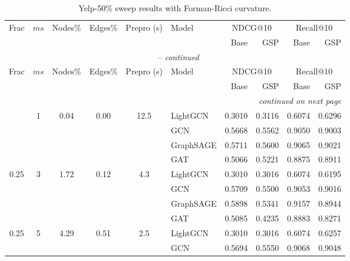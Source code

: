 {\footnotesize
\setlength{\tabcolsep}{4pt}
\begin{longtable}{cccccl rrrr}
\caption{Yelp-50\% sweep results with Forman-Ricci curvature.}
\label{tab:yelp_forman_ricci_sweep} \\
\toprule
\multirow{2}{*}{Frac} & \multirow{2}{*}{$ms$} & \multirow{2}{*}{Nodes\%} & \multirow{2}{*}{Edges\%} & \multirow{2}{*}{Prepro (s)} & \multirow{2}{*}{Model} &
  \multicolumn{2}{c}{NDCG@10} & \multicolumn{2}{c}{Recall@10} \\
\cmidrule(lr){7-8}\cmidrule(lr){9-10}
 & & & & & & Base & GSP & Base & GSP \\
\midrule
\endfirsthead
\multicolumn{10}{c}{\tablename~\thetable{} -- \textit{continued}} \\
\toprule
\multirow{2}{*}{Frac} & \multirow{2}{*}{$ms$} & \multirow{2}{*}{Nodes\%} & \multirow{2}{*}{Edges\%} & \multirow{2}{*}{Prepro (s)} & \multirow{2}{*}{Model} &
  \multicolumn{2}{c}{NDCG@10} & \multicolumn{2}{c}{Recall@10} \\
\cmidrule(lr){7-8}\cmidrule(lr){9-10}
 & & & & & & Base & GSP & Base & GSP \\
\midrule
\endhead
\midrule \multicolumn{10}{r}{\textit{continued on next page}} \\
\endfoot
\bottomrule
\endlastfoot
\multirow{4}{*}{0.25} & \multirow{4}{*}{1} & \multirow{4}{*}{0.04} & \multirow{4}{*}{0.00} & \multirow{4}{*}{12.5} & LightGCN & 0.3010 & 0.3116 & 0.6074 & 0.6296 \\
 & & & & & GCN & 0.5668 & 0.5562 & 0.9050 & 0.9003 \\
 & & & & & GraphSAGE & 0.5711 & 0.5600 & 0.9065 & 0.9021 \\
 & & & & & GAT & 0.5066 & 0.5221 & 0.8875 & 0.8911 \\
\midrule
\multirow{4}{*}{0.25} & \multirow{4}{*}{3} & \multirow{4}{*}{1.72} & \multirow{4}{*}{0.12} & \multirow{4}{*}{4.3} & LightGCN & 0.3010 & 0.3016 & 0.6074 & 0.6195 \\
 & & & & & GCN & 0.5709 & 0.5500 & 0.9053 & 0.9016 \\
 & & & & & GraphSAGE & 0.5898 & 0.5341 & 0.9157 & 0.8944 \\
 & & & & & GAT & 0.5085 & 0.4235 & 0.8883 & 0.8271 \\
\midrule
\multirow{4}{*}{0.25} & \multirow{4}{*}{5} & \multirow{4}{*}{4.29} & \multirow{4}{*}{0.51} & \multirow{4}{*}{2.5} & LightGCN & 0.3010 & 0.3016 & 0.6074 & 0.6257 \\
 & & & & & GCN & 0.5694 & 0.5550 & 0.9068 & 0.9048 \\

\end{longtable}}
